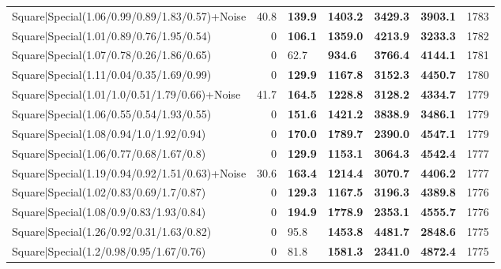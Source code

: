 \begin{tabular}{lrllllr}
 Square|Special(1.06/0.99/0.89/1.83/0.57)+Noise                &            40.8 & \textbf{139.9} & \textbf{1403.2} & \textbf{3429.3} & \textbf{3903.1} &         1783 \\
 Square|Special(1.01/0.89/0.76/1.95/0.54)                      &             0   & \textbf{106.1} & \textbf{1359.0} & \textbf{4213.9} & \textbf{3233.3} &         1782 \\
 Square|Special(1.07/0.78/0.26/1.86/0.65)                      &             0   & 62.7           & \textbf{934.6}  & \textbf{3766.4} & \textbf{4144.1} &         1781 \\
 Square|Special(1.11/0.04/0.35/1.69/0.99)                      &             0   & \textbf{129.9} & \textbf{1167.8} & \textbf{3152.3} & \textbf{4450.7} &         1780 \\
 Square|Special(1.01/1.0/0.51/1.79/0.66)+Noise                 &            41.7 & \textbf{164.5} & \textbf{1228.8} & \textbf{3128.2} & \textbf{4334.7} &         1779 \\
 Square|Special(1.06/0.55/0.54/1.93/0.55)                      &             0   & \textbf{151.6} & \textbf{1421.2} & \textbf{3838.9} & \textbf{3486.1} &         1779 \\
 Square|Special(1.08/0.94/1.0/1.92/0.94)                       &             0   & \textbf{170.0} & \textbf{1789.7} & \textbf{2390.0} & \textbf{4547.1} &         1779 \\
 Square|Special(1.06/0.77/0.68/1.67/0.8)                       &             0   & \textbf{129.9} & \textbf{1153.1} & \textbf{3064.3} & \textbf{4542.4} &         1777 \\
 Square|Special(1.19/0.94/0.92/1.51/0.63)+Noise                &            30.6 & \textbf{163.4} & \textbf{1214.4} & \textbf{3070.7} & \textbf{4406.2} &         1777 \\
 Square|Special(1.02/0.83/0.69/1.7/0.87)                       &             0   & \textbf{129.3} & \textbf{1167.5} & \textbf{3196.3} & \textbf{4389.8} &         1776 \\
 Square|Special(1.08/0.9/0.83/1.93/0.84)                       &             0   & \textbf{194.9} & \textbf{1778.9} & \textbf{2353.1} & \textbf{4555.7} &         1776 \\
 Square|Special(1.26/0.92/0.31/1.63/0.82)                      &             0   & 95.8           & \textbf{1453.8} & \textbf{4481.7} & \textbf{2848.6} &         1775 \\
 Square|Special(1.2/0.98/0.95/1.67/0.76)                       &             0   & 81.8           & \textbf{1581.3} & \textbf{2341.0} & \textbf{4872.4} &         1775 \\

\end{tabular}
